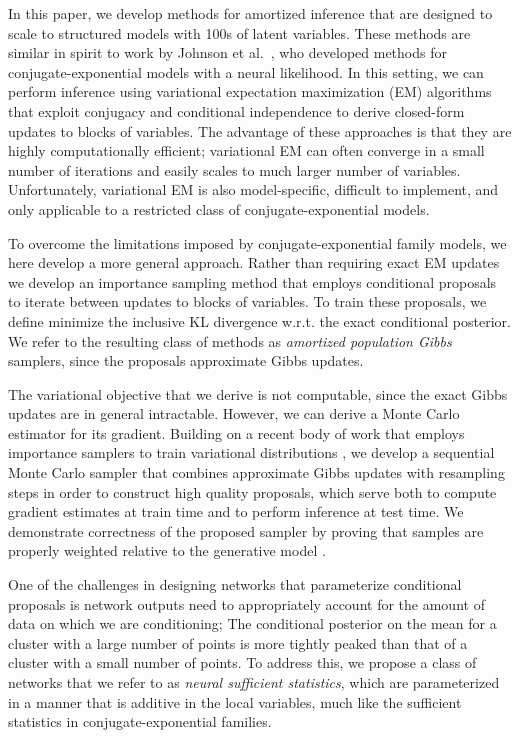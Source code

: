 \documentclass{article}
\theoremstyle{definition}
\begin{document}
In this paper, we develop methods for amortized inference that are designed to scale to structured models with 100s of latent variables. These methods are similar in spirit to work by Johnson et al.~\cite{johnson2016composing}, who developed methods for  conjugate-exponential models with a neural likelihood. In this setting, we can perform inference using variational expectation maximization (EM) algorithms \cite{beal2003variational,bishop2006pattern,wainwright2008graphical} that exploit conjugacy and conditional independence to derive closed-form updates to blocks of variables. The advantage of these approaches is that they are highly computationally efficient; variational EM can often converge in a small number of iterations and easily scales to much larger number of variables. Unfortunately, variational EM is also model-specific, difficult to implement, and only applicable to a restricted class of conjugate-exponential models.

To overcome the limitations imposed by conjugate-exponential family models, we here develop a more general approach. Rather than requiring exact EM updates we develop an importance sampling method that employs conditional proposals to iterate between updates to blocks of variables. To train these proposals, we define minimize the inclusive KL divergence w.r.t. the exact conditional posterior. We refer to the resulting class of methods as \emph{amortized population Gibbs} samplers, since the proposals approximate Gibbs updates.

The variational objective that we derive is not computable, since the exact Gibbs updates are in general intractable. However, we can derive a Monte Carlo estimator for its gradient. Building on a recent body of work that employs importance samplers to train variational distributions \cite{burda2016importance,le2018auto-encoding,maddison2017filtering,naesseth2018variational}, we develop a sequential Monte Carlo sampler \cite{delmoral2006sequential} that combines approximate Gibbs updates with resampling steps in order to construct high quality proposals, which serve both to compute gradient estimates at train time and to perform inference at test time. We demonstrate correctness of the proposed sampler by  proving that samples are properly weighted relative to the generative model \cite{naesseth2015nested}.

One of the challenges in designing networks that parameterize conditional proposals is network outputs need to appropriately account for the amount of data on which we are conditioning; The conditional posterior on the mean for a cluster with a large number of points is more tightly peaked than that of a cluster with a small number of points. To address this, we propose a class of networks that we refer to as \emph{neural sufficient statistics}, which are parameterized in a manner that is additive in the local variables, much like the sufficient statistics in conjugate-exponential families.
\end{document}
